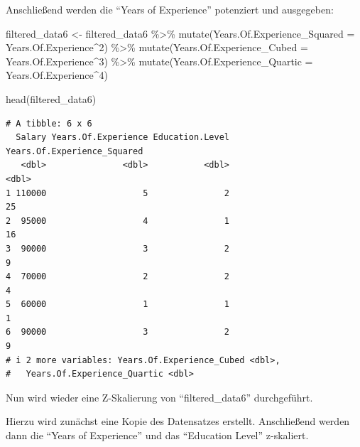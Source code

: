 \documentclass[
  letterpaper,
  DIV=11,
  numbers=noendperiod]{scrartcl}
\newenvironment{Shaded}{\begin{snugshade}}{\end{snugshade}}
\newcommand{\AttributeTok}[1]{\textcolor[rgb]{0.40,0.45,0.13}{#1}}
\newcommand{\DecValTok}[1]{\textcolor[rgb]{0.68,0.00,0.00}{#1}}
\newcommand{\FunctionTok}[1]{\textcolor[rgb]{0.28,0.35,0.67}{#1}}
\newcommand{\NormalTok}[1]{\textcolor[rgb]{0.00,0.23,0.31}{#1}}
\newcommand{\OtherTok}[1]{\textcolor[rgb]{0.00,0.23,0.31}{#1}}
\newcommand{\SpecialCharTok}[1]{\textcolor[rgb]{0.37,0.37,0.37}{#1}}
\begin{document}
Anschließend werden die ``Years of Experience'' potenziert und
ausgegeben:

\begin{Shaded}
\begin{Highlighting}[]
\NormalTok{filtered\_data6 }\OtherTok{\textless{}{-}}\NormalTok{ filtered\_data6 }\SpecialCharTok{\%\textgreater{}\%}
  \FunctionTok{mutate}\NormalTok{(}\AttributeTok{Years.Of.Experience\_Squared =}\NormalTok{ Years.Of.Experience}\SpecialCharTok{\^{}}\DecValTok{2}\NormalTok{) }\SpecialCharTok{\%\textgreater{}\%}
  \FunctionTok{mutate}\NormalTok{(}\AttributeTok{Years.Of.Experience\_Cubed =}\NormalTok{ Years.Of.Experience}\SpecialCharTok{\^{}}\DecValTok{3}\NormalTok{) }\SpecialCharTok{\%\textgreater{}\%}
  \FunctionTok{mutate}\NormalTok{(}\AttributeTok{Years.Of.Experience\_Quartic =}\NormalTok{ Years.Of.Experience}\SpecialCharTok{\^{}}\DecValTok{4}\NormalTok{)}
\end{Highlighting}
\end{Shaded}

\begin{Shaded}
\begin{Highlighting}[]
\FunctionTok{head}\NormalTok{(filtered\_data6)}
\end{Highlighting}
\end{Shaded}

\begin{verbatim}
# A tibble: 6 x 6
  Salary Years.Of.Experience Education.Level Years.Of.Experience_Squared
   <dbl>               <dbl>           <dbl>                       <dbl>
1 110000                   5               2                          25
2  95000                   4               1                          16
3  90000                   3               2                           9
4  70000                   2               2                           4
5  60000                   1               1                           1
6  90000                   3               2                           9
# i 2 more variables: Years.Of.Experience_Cubed <dbl>,
#   Years.Of.Experience_Quartic <dbl>
\end{verbatim}

Nun wird wieder eine Z-Skalierung von ``filtered\_data6'' durchgeführt.

Hierzu wird zunächst eine Kopie des Datensatzes erstellt. Anschließend
werden dann die ``Years of Experience'' und das ``Education Level''
z-skaliert.
\end{document}
